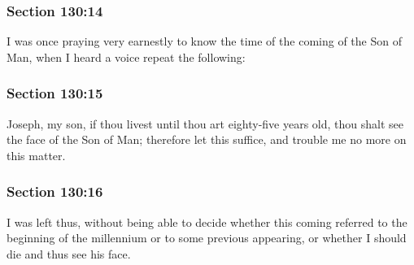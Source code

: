 	\subsubsection{Section 130:14} %
		\label{DC130-14}

		I was once praying very earnestly to know the time of the coming of the Son of Man, when I heard a voice repeat the following:


	\subsubsection{Section 130:15} %
		\label{DC130-15}

		Joseph, my son, if thou livest until thou art eighty-five years old, thou shalt see the face of the Son of Man; therefore let this suffice, and trouble me no more on this matter.


	\subsubsection{Section 130:16} %
		\label{DC130-16}

		I was left thus, without being able to decide whether this coming referred to the beginning of the millennium or to some previous appearing, or whether I should die and thus see his face.


